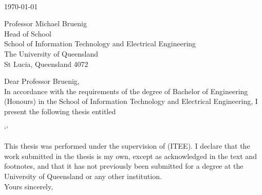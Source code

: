 \begin{flushright}
    \authortext\\
    \href{mailto:\authoremailtext}{\authoremailtext}
\end{flushright}

\vspace{2cm}
\noindent
\today \\\bigskip

\noindent
Professor Michael Bruenig\\
Head of School\\
School of Information Technology and Electrical Engineering\\
The University of Queensland\\
St Lucia, Queensland 4072\\\bigskip

\noindent
Dear Professor Bruenig,\\

In accordance with the requirements of the degree of Bachelor of Engineering (Honours) in the School of Information Technology and Electrical Engineering, I present the following thesis entitled

\begin{center}
`\titletext'
\end{center}

This thesis was performed under the supervision of \supervisornametext (ITEE). I declare that the work submitted in the thesis is my own, except as acknowledged in the text and footnotes, and that it has not previously been submitted for a degree at the University of Queensland or any other institution.\\

\noindent
Yours sincerely,\\\\%

\noindent
\authortext

\clearpage